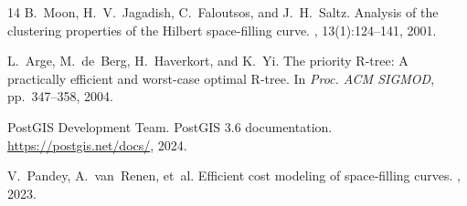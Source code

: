 \documentclass[10pt,twocolumn]{article}
\begin{document}
\begin{thebibliography}{14}
B.~Moon, H.~V.~Jagadish, C.~Faloutsos, and J.~H.~Saltz.
\newblock Analysis of the clustering properties of the Hilbert space-filling curve.
, 13(1):124--141, 2001.

L.~Arge, M.~de~Berg, H.~Haverkort, and K.~Yi.
\newblock The priority R-tree: A practically efficient and worst-case optimal R-tree.
\newblock In {\em Proc. ACM SIGMOD}, pp.~347--358, 2004.

PostGIS Development Team.
\newblock PostGIS 3.6 documentation.
\newblock \url{https://postgis.net/docs/}, 2024.

V.~Pandey, A.~van~Renen, et~al.
\newblock Efficient cost modeling of space-filling curves.
, 2023.

\end{thebibliography}
\end{document}

